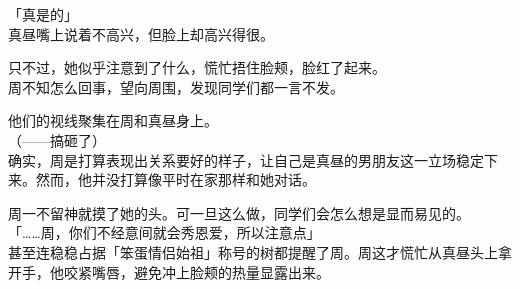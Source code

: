 「真是的」\\

真昼嘴上说着不高兴，但脸上却高兴得很。

只不过，她似乎注意到了什么，慌忙捂住脸颊，脸红了起来。\\

周不知怎么回事，望向周围，发现同学们都一言不发。

他们的视线聚集在周和真昼身上。\\

（——搞砸了）\\

确实，周是打算表现出关系要好的样子，让自己是真昼的男朋友这一立场稳定下来。然而，他并没打算像平时在家那样和她对话。

周一不留神就摸了她的头。可一旦这么做，同学们会怎么想是显而易见的。\\

「……周，你们不经意间就会秀恩爱，所以注意点」\\

甚至连稳稳占据「笨蛋情侣始祖」称号的树都提醒了周。周这才慌忙从真昼头上拿开手，他咬紧嘴唇，避免冲上脸颊的热量显露出来。
